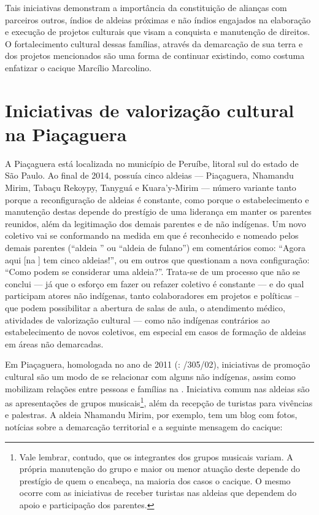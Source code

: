 {{Tais iniciativas demonstram a importância da constituição de alianças
com parceiros outros, índios de aldeias próximas e não índios engajados
na elaboração e execução de projetos culturais que visam a conquista e
manutenção de direitos. O fortalecimento cultural dessas famílias,
através da demarcação de sua terra e dos projetos mencionados são uma
forma de continuar existindo, como costuma enfatizar o cacique Marcílio
Marcolino.  

\section{Iniciativas de valorização cultural na  Piaçaguera}

A  Piaçaguera está localizada no município de Peruíbe, litoral sul do
estado de São Paulo. Ao final de 2014, possuía cinco aldeias ---
Piaçaguera, Nhamandu Mirim, Tabaçu Rekoypy, Tanyguá e Kuara’y-Mirim ---
número variante tanto porque a reconfiguração de aldeias é constante,
como porque o estabelecimento e manutenção destas depende do prestígio
de uma liderança em manter os parentes reunidos, além da legitimação
dos demais parentes e de não indígenas. Um novo coletivo vai se
conformando na medida em que é reconhecido e nomeado pelos demais
parentes (``aldeia '' ou ``aldeia de fulano'') em comentários como: ``Agora
aqui [na ] tem cinco aldeias!'', ou em outros que questionam a nova
configuração: ``Como podem se considerar uma aldeia?''. Trata-se de um
processo que não se conclui --- já que o esforço em fazer ou refazer
coletivo é constante --- e do qual participam atores não indígenas, tanto
colaboradores em projetos e políticas – que podem possibilitar a
abertura de salas de aula, o atendimento médico, atividades de
valorização cultural --- como não indígenas contrários ao estabelecimento
de novos coletivos, em especial em casos de formação de aldeias em
áreas não demarcadas. 

Em Piaçaguera,  homologada no ano de 2011 (: /305/02),
iniciativas de promoção cultural são um modo de se relacionar com
alguns não indígenas, assim como mobilizam relações entre pessoas e
famílias na . Iniciativa comum nas aldeias são as apresentações de
grupos musicais\footnote{Vale lembrar, contudo, que os integrantes dos
grupos musicais variam. A própria manutenção do grupo e maior ou menor
atuação deste depende do prestígio de quem o encabeça, na maioria dos
casos o cacique. O mesmo ocorre com as iniciativas de receber turistas
nas aldeias que dependem do apoio e participação dos parentes.}, além
da recepção de turistas para vivências e palestras. A aldeia Nhamandu
Mirim, por exemplo, tem um blog com fotos, notícias sobre a demarcação
territorial e a seguinte mensagem do cacique:

}}
